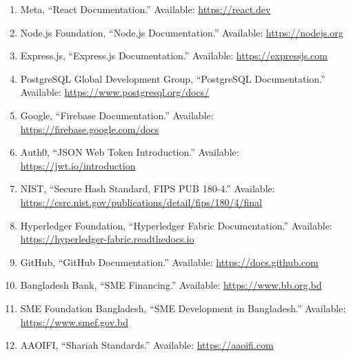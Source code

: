 \documentclass[12pt,a4paper]{article}
\begin{document}
\begin{enumerate}

\item Meta, ``React Documentation.'' Available:
\url{https://react.dev}

\item Node.js Foundation, ``Node.js Documentation.'' Available:
\url{https://nodejs.org}

\item Express.js, ``Express.js Documentation.'' Available:
\url{https://expressjs.com}

\item PostgreSQL Global Development Group, ``PostgreSQL Documentation.''
Available:
\url{https://www.postgresql.org/docs/}

\item Google, ``Firebase Documentation.'' Available:
\url{https://firebase.google.com/docs}

\item Auth0, ``JSON Web Token Introduction.'' Available:
\url{https://jwt.io/introduction}

\item NIST, ``Secure Hash Standard, FIPS PUB 180-4.'' Available:
\url{https://csrc.nist.gov/publications/detail/fips/180/4/final}

\item Hyperledger Foundation, ``Hyperledger Fabric Documentation.''
Available:
\url{https://hyperledger-fabric.readthedocs.io}

\item GitHub, ``GitHub Documentation.'' Available:
\url{https://docs.github.com}

\item Bangladesh Bank, ``SME Financing.'' Available:
\url{https://www.bb.org.bd}

\item SME Foundation Bangladesh, ``SME Development in Bangladesh.''
Available:
\url{https://www.smef.gov.bd}

\item AAOIFI, ``Shariah Standards.'' Available:
\url{https://aaoifi.com}

\end{enumerate}

\end{document}
